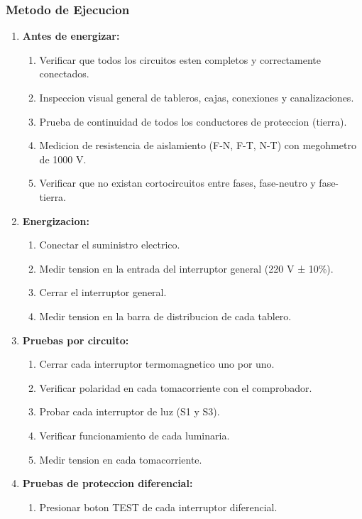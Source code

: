 \subsubsection{Metodo de Ejecucion}

\begin{enumerate}
  \item \textbf{Antes de energizar:}
  \begin{enumerate}
    \item Verificar que todos los circuitos esten completos y correctamente conectados.
    \item Inspeccion visual general de tableros, cajas, conexiones y canalizaciones.
    \item Prueba de continuidad de todos los conductores de proteccion (tierra).
    \item Medicion de resistencia de aislamiento (F-N, F-T, N-T) con megohmetro de 1000 V.
    \item Verificar que no existan cortocircuitos entre fases, fase-neutro y fase-tierra.
  \end{enumerate}
  \item \textbf{Energizacion:}
  \begin{enumerate}
    \item Conectar el suministro electrico.
    \item Medir tension en la entrada del interruptor general (220 V ± 10\%).
    \item Cerrar el interruptor general.
    \item Medir tension en la barra de distribucion de cada tablero.
  \end{enumerate}
  \item \textbf{Pruebas por circuito:}
  \begin{enumerate}
    \item Cerrar cada interruptor termomagnetico uno por uno.
    \item Verificar polaridad en cada tomacorriente con el comprobador.
    \item Probar cada interruptor de luz (S1 y S3).
    \item Verificar funcionamiento de cada luminaria.
    \item Medir tension en cada tomacorriente.
  \end{enumerate}
  \item \textbf{Pruebas de proteccion diferencial:}
  \begin{enumerate}
    \item Presionar boton TEST de cada interruptor diferencial.

\end{enumerate}
\end{enumerate}

